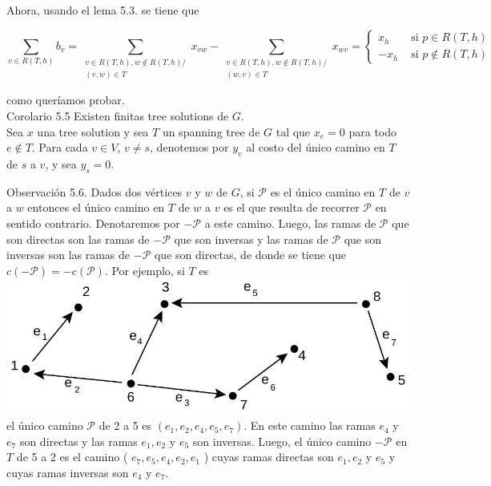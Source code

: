 \documentclass[10pt]{article}
\begin{document}
Ahora, usando el lema 5.3. se tiene que

$$
\sum_{v \in R(T, h)} b_{v}=\sum_{\substack{v \in R(T, h), w \notin R(T, h) / \\(v, w) \in T}} x_{v w}-\sum_{\substack{v \in R(T, h), w \notin R(T, h) / \\(w, v) \in T}} x_{w v}= \begin{cases}x_{h} & \text { si } p \in R(T, h) \\ -x_{h} & \text { si } p \notin R(T, h)\end{cases}
$$

como queríamos probar.\\
Corolario 5.5 Existen finitas tree solutions de $G$.\\
Sea $x$ una tree solution y sea $T$ un spanning tree de $G$ tal que $x_{e}=0$ para todo $e \notin T$. Para cada $v \in V$, $v \neq s$, denotemos por $y_{v}$ al costo del único camino en $T$ de $s$ a $v$, y sea $y_{s}=0$.

Observación 5.6. Dados dos vértices $v$ y $w$ de $G$, si $\mathcal{P}$ es el único camino en $T$ de $v$ a $w$ entonces el único camino en $T$ de $w$ a $v$ es el que resulta de recorrer $\mathcal{P}$ en sentido contrario. Denotaremos por $-\mathcal{P}$ a este camino. Luego, las ramas de $\mathcal{P}$ que son directas son las ramas de $-\mathcal{P}$ que son inversas y las ramas de $\mathcal{P}$ que son inversas son las ramas de $-\mathcal{P}$ que son directas, de donde se tiene que $c(-\mathcal{P})=-c(\mathcal{P})$. Por ejemplo, si $T$ es\\
\includegraphics[max width=\textwidth, center]{2025_09_05_955b52bfc43174a24a9ag-22(1)}\\
el único camino $\mathcal{P}$ de 2 a 5 es $\left(e_{1}, e_{2}, e_{4}, e_{5}, e_{7}\right)$. En este camino las ramas $e_{4}$ y $e_{7}$ son directas y las ramas $e_{1}, e_{2}$ y $e_{5}$ son inversas. Luego, el único camino $-\mathcal{P}$ en $T$ de 5 a 2 es el camino ( $e_{7}, e_{5}, e_{4}, e_{2}, e_{1}$ ) cuyas ramas directas son $e_{1}, e_{2}$ y $e_{5}$ y cuyas ramas inversas son $e_{4}$ y $e_{7}$.
\end{document}
